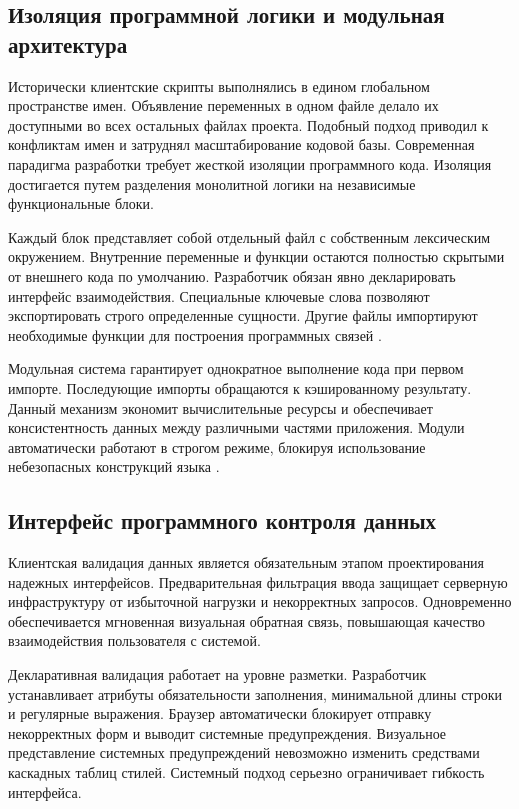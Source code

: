 \documentclass[bachelor, och, pract, times]{SCWorks}
\begin{document}
\subsection{Изоляция программной логики и модульная архитектура}
Исторически клиентские скрипты выполнялись в едином глобальном пространстве
имен. Объявление переменных в одном файле делало их доступными во всех
остальных файлах проекта. Подобный подход приводил к конфликтам имен и
затруднял масштабирование кодовой базы. Современная парадигма разработки
требует жесткой изоляции программного кода. Изоляция достигается путем
разделения монолитной логики на независимые функциональные блоки.

Каждый блок представляет собой отдельный файл с собственным лексическим
окружением. Внутренние переменные и функции остаются полностью скрытыми от
внешнего кода по умолчанию. Разработчик обязан явно декларировать интерфейс
взаимодействия. Специальные ключевые слова позволяют экспортировать строго
определенные сущности. Другие файлы импортируют необходимые функции для
построения программных связей \cite{mdn_modules}.

Модульная система гарантирует однократное выполнение кода при первом импорте.
Последующие импорты обращаются к кэшированному результату. Данный механизм
экономит вычислительные ресурсы и обеспечивает консистентность данных между
различными частями приложения. Модули автоматически работают в строгом режиме,
блокируя использование небезопасных конструкций языка \cite{morison}.

\subsection{Интерфейс программного контроля данных}
Клиентская валидация данных является обязательным этапом проектирования
надежных интерфейсов. Предварительная фильтрация ввода защищает серверную
инфраструктуру от избыточной нагрузки и некорректных запросов. Одновременно
обеспечивается мгновенная визуальная обратная связь, повышающая качество
взаимодействия пользователя с системой.

Декларативная валидация работает на уровне разметки. Разработчик устанавливает
атрибуты обязательности заполнения, минимальной длины строки и регулярные
выражения. Браузер автоматически блокирует отправку некорректных форм и выводит
системные предупреждения. Визуальное представление системных предупреждений
невозможно изменить средствами каскадных таблиц стилей. Системный подход
серьезно ограничивает гибкость интерфейса.
\end{document}
